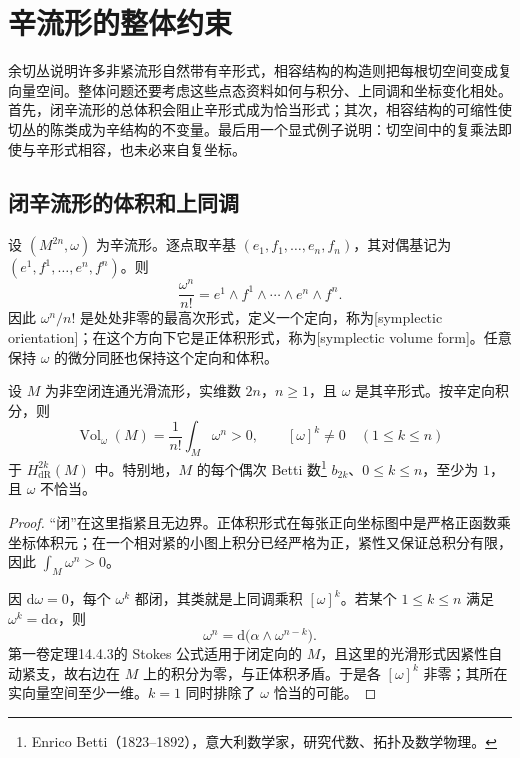 
% 
% 
% 

\section{辛流形的整体约束}
\label{g4:sec:0704}

余切丛说明许多非紧流形自然带有辛形式，相容结构的构造则把每根切空间变成复向量空间。整体问题还要考虑这些点态资料如何与积分、上同调和坐标变化相处。首先，闭辛流形的总体积会阻止辛形式成为恰当形式；其次，相容结构的可缩性使切丛的陈类成为辛结构的不变量。最后用一个显式例子说明：切空间中的复乘法即使与辛形式相容，也未必来自复坐标。

\subsection{闭辛流形的体积和上同调}
\label{g4:subsec:0704:01}

设 \((M^{2n},\omega)\) 为辛流形。逐点取辛基 \((e_1,f_1,\ldots,e_n,f_n)\)，其对偶基记为 \((e^1,f^1,\ldots,e^n,f^n)\)。则
\[
	\frac{\omega^n}{n!}=e^1\wedge f^1\wedge\cdots\wedge e^n\wedge f^n.
\]
因此 \(\omega^n/n!\) 是处处非零的最高次形式，定义一个定向，称为[symplectic orientation]；在这个方向下它是正体积形式，称为[symplectic volume form]。任意保持 \(\omega\) 的微分同胚也保持这个定向和体积。

\begin{theorem}\label{g4:thm:0704:cohomology-obstruction}
	设 \(M\) 为非空闭连通光滑流形，实维数 \(2n\)，\(n\ge1\)，且 \(\omega\) 是其辛形式。按辛定向积分，则
	\[
		\operatorname{Vol}_\omega(M)=\frac1{n!}\int_M\omega^n>0,
		\qquad [\omega]^k\ne0\quad(1\le k\le n)
	\]
	于 \(H^{2k}_{\mathrm{dR}}(M)\) 中。特别地，\(M\) 的每个偶次 Betti 数\footnote{Enrico Betti（1823--1892），意大利数学家，研究代数、拓扑及数学物理。} \(b_{2k}\)、\(0\le k\le n\)，至少为 \(1\)，且 \(\omega\) 不恰当。
\end{theorem}
\begin{proof}
	“闭”在这里指紧且无边界。正体积形式在每张正向坐标图中是严格正函数乘坐标体积元；在一个相对紧的小图上积分已经严格为正，紧性又保证总积分有限，因此 \(\int_M\omega^n>0\)。

	因 \(\mathrm{d}\omega=0\)，每个 \(\omega^k\) 都闭，其类就是上同调乘积 \([\omega]^k\)。若某个 \(1\le k\le n\) 满足 \(\omega^k=\mathrm{d}\alpha\)，则
	\[
		\omega^n=\mathrm{d}\bigl(\alpha\wedge\omega^{n-k}\bigr).
	\]
	第一卷定理14.4.3的 Stokes 公式适用于闭定向的 \(M\)，且这里的光滑形式因紧性自动紧支，故右边在 \(M\) 上的积分为零，与正体积矛盾。于是各 \([\omega]^k\) 非零；其所在实向量空间至少一维。\(k=1\) 同时排除了 \(\omega\) 恰当的可能。
\end{proof}


